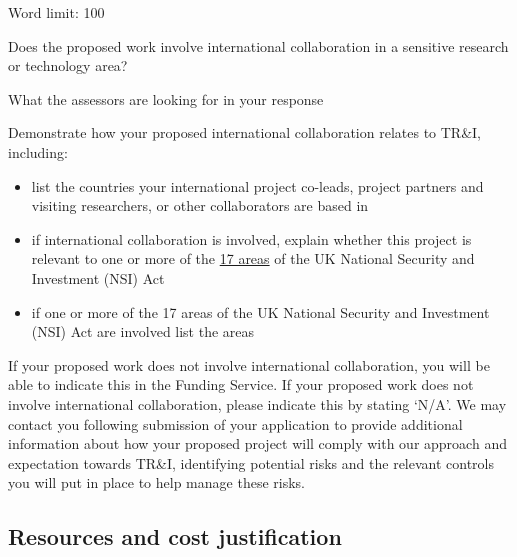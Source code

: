 \documentclass[12pt]{article}
\newenvironment{instruction}{\par\color{red}}{\par}
\begin{document}
\begin{instruction}

Word limit: 100

Does the proposed work involve international collaboration in a sensitive
research or technology area?

What the assessors are looking for in your response

Demonstrate how your proposed international collaboration relates to TR\&I,
including:

\begin{itemize}

	\item list the countries your international project co-leads, project
partners and visiting researchers, or other collaborators are based in

	\item if international collaboration is involved, explain whether this project is relevant to one or more of the \href{https://www.gov.uk/government/publications/national-security-and-investment-act-guidance-on-notifiable-acquisitions/national-security-and-investment-act-guidance-on-notifiable-acquisitions}{17 areas} of the UK National Security
and Investment (NSI) Act

	\item if one or more of the 17 areas of the UK National Security and
Investment (NSI) Act are involved list the areas

\end{itemize}

If your proposed work does not involve international collaboration, you will be
able to indicate this in the Funding Service. If your proposed work does not
involve international collaboration, please indicate this by stating ‘N/A’.
We may contact you following submission of your application to provide
additional information about how your proposed project will comply with our
approach and expectation towards TR\&I, identifying potential risks and the
relevant controls you will put in place to help manage these risks.

\end{instruction}

% 

\pagebreak
\subsection{Resources and cost justification}
\end{document}
